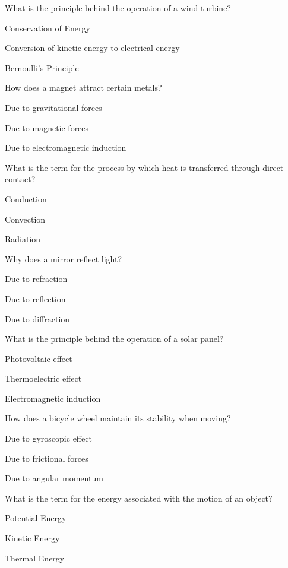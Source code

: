\begin{enhancedmcq}{What is the principle behind the operation of a wind turbine?}
\item Conservation of Energy
\item Conversion of kinetic energy to electrical energy
\item Bernoulli's Principle

\end{enhancedmcq}
\begin{enhancedmcq}{How does a magnet attract certain metals?}
\item Due to gravitational forces
\item Due to magnetic forces
\item Due to electromagnetic induction

\end{enhancedmcq}
\begin{enhancedmcq}{What is the term for the process by which heat is transferred through direct contact?}
\item Conduction
\item Convection
\item Radiation

\end{enhancedmcq}
\begin{enhancedmcq}{Why does a mirror reflect light?}
\item Due to refraction
\item Due to reflection
\item Due to diffraction

\end{enhancedmcq}
\begin{enhancedmcq}{What is the principle behind the operation of a solar panel?}
\item Photovoltaic effect
\item Thermoelectric effect
\item Electromagnetic induction

\end{enhancedmcq}
\begin{enhancedmcq}{How does a bicycle wheel maintain its stability when moving?}
\item Due to gyroscopic effect
\item Due to frictional forces
\item Due to angular momentum

\end{enhancedmcq}
\begin{enhancedmcq}{What is the term for the energy associated with the motion of an object?}
\item Potential Energy
\item Kinetic Energy
\item Thermal Energy
\end{enhancedmcq}